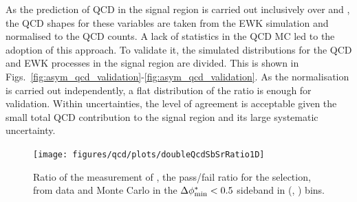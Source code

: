 As the prediction of QCD in the signal region is carried out
inclusively over \nb and \mht, the QCD shapes for these variables are
taken from the EWK simulation and normalised to the QCD counts. 
A lack of statistics in
the QCD MC led to the adoption of this approach. To validate it, the simulated \mht distributions
for the QCD and EWK processes in the signal region are divided. This is shown in
Figs.~\ref{fig:asym_qcd_validation}-\ref{fig:asym_qcd_validation}.
As the normalisation is carried out independently, a flat distribution
of the ratio is enough for validation. Within uncertainties, the level of agreement is acceptable given the
small total QCD contribution to the signal region and its large
systematic uncertainty.

\begin{figure}[h!]
  \begin{center}        
    \texttt{[image: figures/qcd/plots/doubleQcdSbSrRatio1D]}
    \caption{ Ratio of the measurement of \rmhtmet, the pass/fail
      ratio for the \mhtmet selection, from data and Monte Carlo in
      the $\bdphi < 0.5$ sideband in (\scalht, \njet) bins.   
    }
    \label{fig:RR_qcd}
  \end{center} 
\end{figure}

